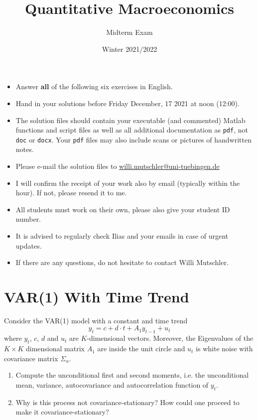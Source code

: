 \documentclass{article}
\begin{document}
	
	\title{Quantitative Macroeconomics}
	\author{Midterm Exam}
	\date{Winter 2021/2022}
	\maketitle
	
	\begin{itemize}
		\item Answer \textbf{all} of the following six exercises in English.
		
		\item Hand in your solutions before Friday December, 17 2021 at noon (12:00).
		
		\item The solution files should contain your executable (and commented) Matlab functions and script files as well as all additional documentation as \texttt{pdf}, not \texttt{doc} or \texttt{docx}. Your \texttt{pdf} files may also include scans or pictures of handwritten notes.
		
		\item Please e-mail the solution files to \url{willi.mutschler@uni-tuebingen.de}
		
		\item I will confirm the receipt of your work also by email (typically within the hour). If not, please resend it to me.
		
		\item All students must work on their own, please also give your student ID number.
		
		\item It is advised to regularly check Ilias and your emails in case of urgent updates.
		
		\item If there are any questions, do not hesitate to contact Willi Mutschler.
	\end{itemize}
	\newpage

	
\section[VAR{(1)} With Time Trend]{VAR{(1)} With Time Trend\label{ex:VAR1timetrend}}
Consider the VAR{(1)} model with a constant and time trend
$$ y_t = c + d\cdot t + A_1 y_{t-1} + u_t$$
where $y_t$, $c$, $d$ and $u_t$ are $K$-dimensional vectors. Moreover, the Eigenvalues of the $K \times K$ dimensional matrix $A_1$ are inside the unit circle and $u_t$ is white noise with covariance matrix $\Sigma_u$.
\begin{enumerate}
	\item Compute the unconditional first and second moments, i.e. the unconditional mean, variance, autocovariance and autocorrelation function of $y_t$.
	\item Why is this process not covariance-stationary? How could one proceed to make it covariance-stationary?
\end{enumerate}
\end{document}
